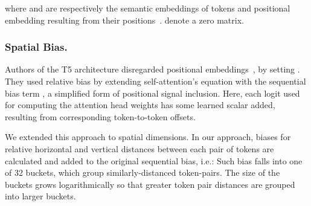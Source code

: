 \documentclass[runningheads]{llncs}
\begin{document}
where  and  are respectively the semantic embeddings of tokens and positional embedding resulting from their positions~\cite{transformer}.  denote a zero matrix.




\subsubsection{Spatial Bias.}\label{layout_emb}
Authors of the T5 architecture disregarded positional embeddings~\cite{2020t5}, by setting . They used relative bias by extending self-attention's equation with the sequential bias term , a simplified form of positional signal inclusion. Here, each logit used for computing the attention head weights has some learned scalar added, resulting from corresponding token-to-token offsets.

We extended this approach to spatial dimensions. In our approach, biases for relative horizontal and vertical distances between each pair of tokens are calculated and added to the original sequential bias, i.e.:  Such bias falls into one of 32 buckets, which group similarly-distanced token-pairs.
The size of the buckets grows logarithmically so that greater token pair distances are grouped into larger buckets.

\end{document}
